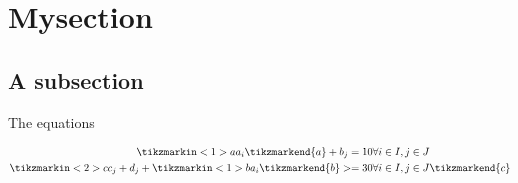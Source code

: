 \documentclass{beamer}
\begin{document}
    \section{Mysection}
    \subsection{A subsection}
    \begin{frame}{The equations}
        \begin{block}{}
            \begin{align}
                \tikzmarkin<1>{a}a_i\tikzmarkend{a} + b_j = 10 & \forall i\in I, j\in J \\
                \tikzmarkin<2>{c}c_j + d_j + \tikzmarkin<1>{b}a_i\tikzmarkend{b} >= 30 & \forall i\in I, j\in J\tikzmarkend{c}
            \end{align}
        \end{block}
    \end{frame}
\end{document}
